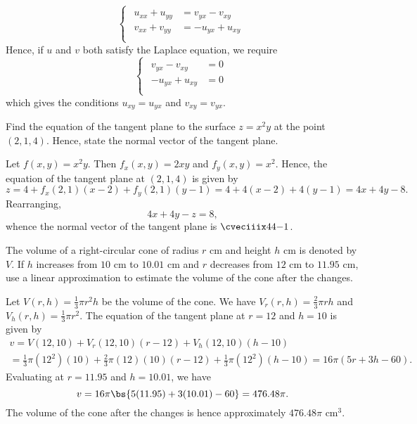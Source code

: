 \begin{solution}
\begin{ppart}
        \[\begin{cases}
            \begin{aligned}
                u_{xx} + u_{yy} &= v_{yx} - v_{xy}\\
                v_{xx} + v_{yy} &= -u_{yx} + u_{xy}\\
            \end{aligned}
        \end{cases}
        \]
        Hence, if $u$ and $v$ both satisfy the Laplace equation, we require 
        \[\begin{cases}
            \begin{aligned}
                v_{yx} - v_{xy} &= 0\\
                -u_{yx} + u_{xy} &= 0\\
            \end{aligned}
        \end{cases}
        \]
        which gives the conditions $u_{xy} = u_{yx}$ and $v_{xy} = v_{yx}$.
    \end{ppart}
\end{solution}

\begin{problem}
    Find the equation of the tangent plane to the surface $z = x^2 y$ at the point $(2, 1, 4)$. Hence, state the normal vector of the tangent plane.
\end{problem}
\begin{solution}
    Let $f(x, y) = x^2y$. Then $f_x(x, y) = 2xy$ and $f_y(x, y) = x^2$. Hence, the equation of the tangent plane at $(2, 1, 4)$ is given by \[z = 4 + f_x(2, 1)(x-2) + f_y(2, 1)(y - 1) = 4 + 4(x-2) + 4(y-1) = 4x + 4y - 8.\] Rearranging, \[4x + 4y - z = 8,\] whence the normal vector of the tangent plane is $\cveciiix44{-1}$.
\end{solution}

\begin{problem}
    The volume of a right-circular cone of radius $r$ cm and height $h$ cm is denoted by $V$. If $h$ increases from $10$ cm to $10.01$ cm and $r$ decreases from $12$ cm to $11.95$ cm, use a linear approximation to estimate the volume of the cone after the changes.
\end{problem}
\begin{solution}
    Let $V(r, h) = \frac13 \pi r^2 h$ be the volume of the cone. We have $V_r(r, h) = \frac23 \pi r h$ and $V_h(r, h) = \frac13 \pi r^2$. The equation of the tangent plane at $r = 12$ and $h = 10$ is given by
    \begin{gather*}
        v = V(12, 10) + V_r(12, 10)(r-12) + V_h(12, 10)(h-10)\\
        = \frac13\pi(12^2)(10) + \frac23 \pi(12)(10)(r - 12) + \frac13 \pi (12^2) (h-10) = 16\pi(5r + 3h - 60).
    \end{gather*}
    Evaluating at $r = 11.95$ and $h = 10.01$, we have
    \[v = 16\pi\bs{5(11.95) + 3(10.01) - 60} = 476.48\pi.\] The volume of the cone after the changes is hence approximately $476.48\pi$ cm$^3$.
\end{solution}


